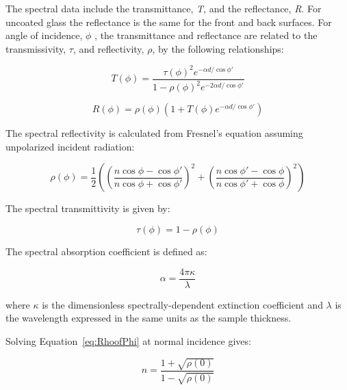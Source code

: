 The spectral data include the transmittance, \emph{T}, and the reflectance, \emph{R}. For uncoated glass the reflectance is the same for the front and back surfaces. For angle of incidence, \(\phi\) , the transmittance and reflectance are related to the transmissivity, \(\tau\), and reflectivity, \(\rho\), by the following relationships:

\begin{equation}
T(\phi ) = \frac{{\tau {{(\phi )}^2}{e^{ - \alpha d/\cos \phi '}}}}{{1 - \rho {{(\phi )}^2}{e^{ - 2\alpha d/\cos \phi '}}}}
\label{eq:TofPhiEquation}
\end{equation}

\begin{equation}
R(\phi ) = \rho (\phi )\left( {1 + T(\phi ){e^{ - \alpha d/\cos \phi '}}} \right)
\label{eq:RofPhiEquation}
\end{equation}

The spectral reflectivity is calculated from Fresnel's equation assuming unpolarized incident radiation:

\begin{equation}
\rho (\phi ) = \frac{1}{2}\left( {{{\left( {\frac{{n\cos \phi  - \cos \phi '}}{{n\cos \phi  + \cos \phi '}}} \right)}^2} + {{\left( {\frac{{n\cos \phi ' - \cos \phi }}{{n\cos \phi ' + \cos \phi }}} \right)}^2}} \right)
\label{eq:RhoofPhi}
\end{equation}

The spectral transmittivity is given by:

\begin{equation}
\tau (\phi ) = 1 - \rho (\phi )
\label{eq:TauofPhiEquation}
\end{equation}

The spectral absorption coefficient is defined as:

\begin{equation}
\alpha  = \frac{4 \pi \kappa}{\lambda}
\label{eq:AlphaAsFunctionOfKappaLambda}
\end{equation}

where \(\kappa\) is the dimensionless spectrally-dependent extinction coefficient and \(\lambda\) is the wavelength expressed in the same units as the sample thickness.

Solving Equation~\ref{eq:RhoofPhi} at normal incidence gives:

\begin{equation}
n = \frac{{1 + \sqrt {\rho (0)} }}{{1 - \sqrt {\rho (0)} }}
\label{eq:NAsFunctionOfRhoEquation}
\end{equation}

